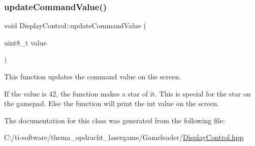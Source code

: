 \subsubsection{\texorpdfstring{update\+Command\+Value()}{updateCommandValue()}}
{\footnotesize\ttfamily void Display\+Control\+::update\+Command\+Value (\begin{DoxyParamCaption}\item[{uint8\+\_\+t}]{value }\end{DoxyParamCaption})\hspace{0.3cm}{\ttfamily [inline]}}



This function updates the command value on the screen. 

If the value is 42, the function makes a star of it. This is special for the star on the gamepad. Else the function will print the int value on the screen. 

The documentation for this class was generated from the following file\+:\begin{DoxyCompactItemize}
\item 
C\+:/ti-\/software/thema\+\_\+opdracht\+\_\+lasergame/\+Gameleader/\mbox{\hyperlink{_gameleader_2_display_control_8hpp}{Display\+Control.\+hpp}}\end{DoxyCompactItemize}
